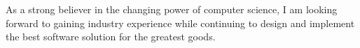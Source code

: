 

\begin{cvparagraph}
As a strong believer in the changing power of computer science, I am looking forward to gaining industry experience while continuing to design and implement the best software solution for the greatest goods. 
% 
% 
\end{cvparagraph}
